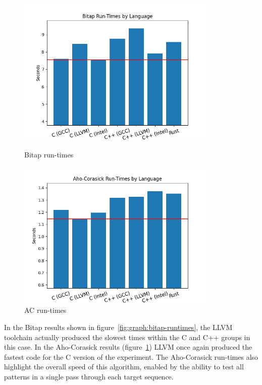 \begin{figure}[ht]
    \centering
    \begin{minipage}[t]{0.45\textwidth}
        \centering
        \includegraphics[width=0.85\textwidth]{figures/algorithm_runtimes-shift_or.png}
        \caption{Bitap run-times}
        \label{fig:graph:bitap-runtimes}
    \end{minipage}\hfill
    \begin{minipage}[t]{0.45\textwidth}
        \centering
        \includegraphics[width=0.85\textwidth]{figures/algorithm_runtimes-aho_corasick.png}
        \caption[Aho-Corasick run-times]{AC run-times}
        \label{fig:graph:ac-runtimes}
    \end{minipage}
\end{figure}

In the Bitap results shown in figure~\ref{fig:graph:bitap-runtimes}, the LLVM toolchain actually produced the slowest times within the C and C++ groups in this case. In the Aho-Corasick results (figure~\ref{fig:graph:ac-runtimes}) LLVM once again produced the fastest code for the C version of the experiment. The Aho-Corasick run-times also highlight the overall speed of this algorithm, enabled by the ability to test all patterns in a single pass through each target sequence.

